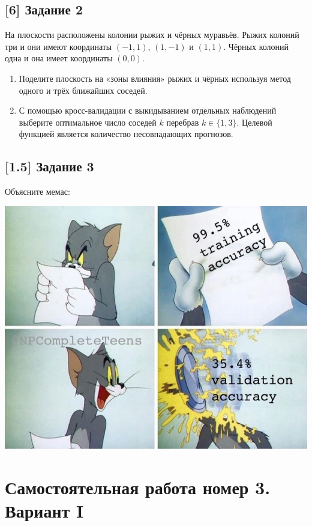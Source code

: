 \documentclass[12pt, a4paper, oneside]{article}
\begin{document}
\subsection*{[6] Задание 2}

На плоскости расположены колонии рыжих и чёрных муравьёв. Рыжих колоний три и они имеют координаты $(-1, 1)$, $(1, -1)$ и $(1, 1)$. Чёрных колоний одна и она имеет координаты $(0, 0)$.

\begin{enumerate}
\item Поделите плоскость на «зоны влияния» рыжих и чёрных используя метод одного и трёх ближайших соседей.

\item С помощью кросс-валидации с выкидыванием отдельных наблюдений выберите оптимальное число соседей $k$ перебрав $k \in \{1, 3 \}$. Целевой функцией является количество несовпадающих прогнозов.
\end{enumerate}


\subsection*{[1.5] Задание 3}

Объясните мемас: 

\begin{center}
	\includegraphics[scale=0.3]{memes2.jpg}
\end{center}


\newpage 


\section*{Самостоятельная работа номер 3. Вариант I}
\end{document}
